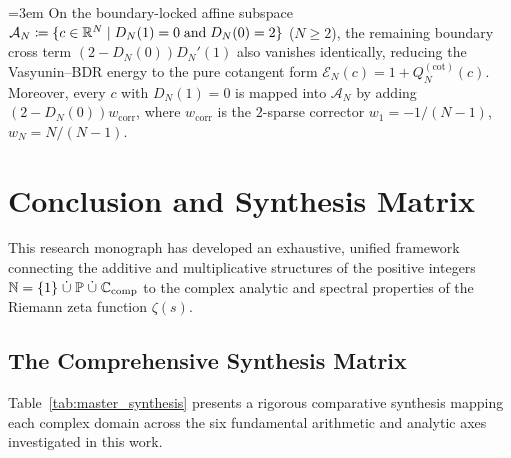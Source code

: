 \begin{corollary}
\label{cor:affine_bdr_pure_cotangent}
\leanok
{\emergencystretch=3em
On the boundary-locked affine subspace $\mathcal{A}_N \coloneqq \{c \in \mathbb{R}^N \mid D_N(1) = 0 \;\text{and}\; D_N(0) = 2\}$ ($N \ge 2$), the remaining boundary cross term $(2 - D_N(0))D_N'(1)$ also vanishes identically, reducing the Vasyunin--BDR energy to the pure cotangent form $\mathcal{E}_N(c) = 1 + Q_N^{(\mathrm{cot})}(c)$. Moreover, every $c$ with $D_N(1) = 0$ is mapped into $\mathcal{A}_N$ by adding $(2 - D_N(0))w_{\mathrm{corr}}$, where $w_{\mathrm{corr}}$ is the $2$-sparse corrector $w_1 = -1/(N-1)$, $w_N = N/(N-1)$.
}
\end{corollary}


\section{Conclusion and Synthesis Matrix}
\label{sec:conclusion}

This research monograph has developed an exhaustive, unified framework connecting the additive and multiplicative structures of the positive integers $\mathbb{N} = \{1\} \;\dot{\cup}\; \mathbb{P} \;\dot{\cup}\; \mathbb{C}_{\mathrm{comp}}$ to the complex analytic and spectral properties of the Riemann zeta function $\zeta(s)$.

\subsection{The Comprehensive Synthesis Matrix}

Table~\ref{tab:master_synthesis} presents a rigorous comparative synthesis mapping each complex domain across the six fundamental arithmetic and analytic axes investigated in this work.

